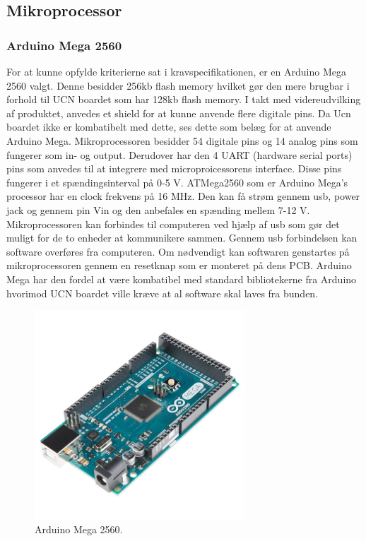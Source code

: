 \subsection{Mikroprocessor}
\subsubsection{Arduino Mega 2560}
For at kunne opfylde kriterierne sat i kravspecifikationen, er en Arduino Mega 2560 valgt. Denne besidder 256kb flash memory hvilket gør den mere brugbar i forhold til UCN boardet som har 128kb flash memory. I takt med videreudvilking af produktet, anvedes et shield for at kunne anvende flere digitale pins. Da Ucn boardet ikke er kombatibelt med dette, ses dette som belæg for at anvende Arduino Mega. 
Mikroprocessoren besidder 54 digitale pins og 14 analog pins som fungerer som in- og output. Derudover har den 4 UART (hardware serial ports) pins som anvedes til at integrere med microproicessorens interface. Disse pins fungerer i et spændingsinterval på 0-5 V. ATMega2560 som er Arduino Mega's processor har en clock frekvens på 16 MHz. Den kan få strøm gennem usb, power jack og gennem pin Vin og den anbefales en spænding mellem 7-12 V. 
Mikroprocessoren kan forbindes til computeren ved hjælp af usb som gør det muligt for de to enheder at kommunikere sammen. Gennem usb forbindelsen kan software overføres fra computeren. Om nødvendigt kan softwaren genstartes på mikroprocessoren gennem en resetknap som er monteret på dens PCB. 
Arduino Mega har den fordel at være kombatibel med standard bibliotekerne fra Arduino hvorimod UCN boardet ville kræve at al software skal laves fra bunden.

\begin{figure}[h!]
  \centering
  \includegraphics[width=0.7\textwidth]{figures/arduinoMega.jpg}
  \caption{Arduino Mega 2560.}
  \label{tempgraf_eksempel1}
\end{figure} 


\newpage



